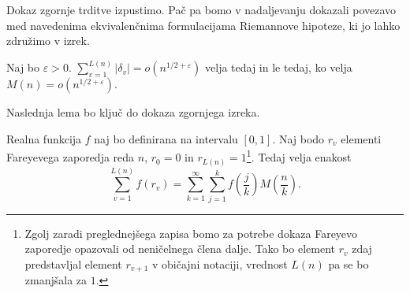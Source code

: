\documentclass[mat1]{fmfdelo}
\begin{document}
Dokaz zgornje trditve izpustimo. Pač pa bomo v nadaljevanju dokazali povezavo med navedenima ekvivalenčnima formulacijama Riemannove hipoteze, ki jo lahko združimo v izrek.

\begin{izrek}
Naj bo $\varepsilon > 0$. \( \sum_{v=1}^{L(n)}|\delta_{v}| = o(n^{1/2+\varepsilon}) \) velja tedaj in le tedaj, ko velja \( M(n) = o(n^{1/2+\varepsilon}). \)
\end{izrek}

Naslednja lema bo ključ do dokaza zgornjega izreka.

\begin{lema}
\label{Lema:RiemFar}
Realna funkcija $f$ naj bo definirana na intervalu $[0,1]$. Naj bodo $r_{v}$ elementi Fareyevega zaporedja reda $n$, $r_{0}=0$ in $r_{L(n)}=1$\footnote{Zgolj zaradi preglednejšega zapisa bomo za potrebe dokaza Fareyevo zaporedje opazovali od neničelnega člena dalje. Tako bo element $r_{v}$ zdaj predstavljal element $r_{v+1}$ v običajni notaciji, vrednost $L(n)$ pa se bo zmanjšala za $1$.}. Tedaj velja enakost
\begin{equation}
	\sum_{v=1}^{L(n)} f(r_v) = \sum_{k=1}^{\infty} \sum_{j=1}^{k} f \left(\frac{j}{k} \right) M \left(\frac{n}{k} \right).
\end{equation}
\end{lema}

\end{document}
